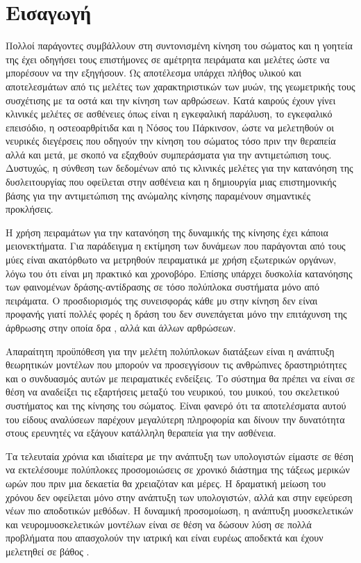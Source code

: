 \chapter{Εισαγωγή}

Πολλοί παράγοντες συμβάλλουν στη συντονισμένη κίνηση του σώματος και η γοητεία της έχει οδηγήσει τους επιστήμονες σε αμέτρητα πειράματα και μελέτες ώστε να μπορέσουν να την εξηγήσουν. Ως αποτέλεσμα υπάρχει πλήθος υλικού και αποτελεσμάτων από τις μελέτες των χαρακτηριστικών των μυών, της γεωμετρικής τους συσχέτισης με τα οστά και την κίνηση των αρθρώσεων. Κατά καιρούς έχουν γίνει κλινικές μελέτες σε ασθένειες όπως είναι η εγκεφαλική παράλυση, το εγκεφαλικό επεισόδιο, η οστεοαρθρίτιδα και η Νόσος του Πάρκινσον, ώστε να μελετηθούν οι νευρικές διεγέρσεις που οδηγούν την κίνηση του σώματος τόσο πριν την θεραπεία αλλά και μετά, με σκοπό να εξαχθούν συμπεράσματα για την αντιμετώπιση τους. Δυστυχώς, η σύνθεση των δεδομένων από τις κλινικές μελέτες για την κατανόηση της δυσλειτουργίας που οφείλεται στην ασθένεια και η δημιουργία μιας επιστημονικής βάσης για την αντιμετώπιση της ανώμαλης κίνησης παραμένουν σημαντικές προκλήσεις.

Η χρήση πειραμάτων για την κατανόηση της δυναμικής της κίνησης έχει κάποια μειονεκτήματα. Για παράδειγμα η εκτίμηση των δυνάμεων που παράγονται από τους μύες είναι ακατόρθωτο να μετρηθούν πειραματικά με χρήση εξωτερικών οργάνων, λόγω του ότι είναι μη πρακτικό και χρονοβόρο. Επίσης υπάρχει δυσκολία κατανόησης των φαινομένων δράσης-αντίδρασης σε τόσο πολύπλοκα συστήματα μόνο από πειράματα. Ο προσδιορισμός της συνεισφοράς κάθε μυ στην κίνηση δεν είναι προφανής γιατί πολλές φορές η δράση του δεν συνεπάγεται μόνο την επιτάχυνση της άρθρωσης στην οποία δρα \cite{zajac-gordon89}, αλλά και άλλων αρθρώσεων.

Απαραίτητη προϋπόθεση για την μελέτη πολύπλοκων διατάξεων είναι η ανάπτυξη θεωρητικών μοντέλων που μπορούν να προσεγγίσουν τις ανθρώπινες δραστηριότητες και ο συνδυασμός αυτών με πειραματικές ενδείξεις. Το σύστημα θα πρέπει να είναι σε θέση να αναδείξει τις εξαρτήσεις μεταξύ του νευρικού, του μυικού, του σκελετικού συστήματος και της κίνησης του σώματος. Είναι φανερό ότι τα αποτελέσματα αυτού του είδους αναλύσεων παρέχουν μεγαλύτερη πληροφορία και δίνουν την δυνατότητα στους ερευνητές να εξάγουν κατάλληλη θεραπεία για την ασθένεια.

Τα τελευταία χρόνια και ιδιαίτερα με την ανάπτυξη των υπολογιστών είμαστε σε θέση να εκτελέσουμε πολύπλοκες προσομοιώσεις σε χρονικό διάστημα της τάξεως μερικών ωρών που πριν μια δεκαετία θα χρειαζόταν και μέρες. Η δραματική μείωση του χρόνου δεν οφείλεται μόνο στην ανάπτυξη των υπολογιστών, αλλά και στην εφεύρεση νέων πιο αποδοτικών μεθόδων. Η δυναμική προσομοίωση, η ανάπτυξη μυοσκελετικών και νευρομυοσκελετικών μοντέλων είναι σε θέση να δώσουν λύση σε πολλά προβλήματα που απασχολούν την ιατρική και είναι ευρέως αποδεκτά και έχουν μελετηθεί σε βάθος \cite{thelen-chumanov06, piazza06, pandy01, zajac02}.

